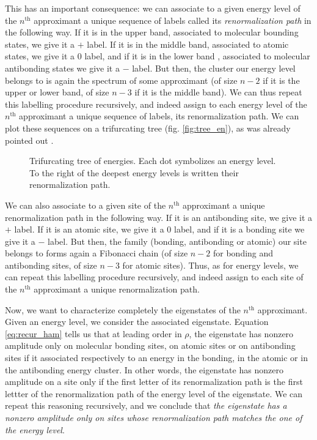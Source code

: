 \documentclass[11pt]{article}
\begin{document}
This has an important consequence: we can associate to a given energy level of the $n^\text{th}$ approximant a unique sequence of labels called its \emph{renormalization path} in the following way.
If it is in the upper band, associated to molecular bounding states, we give it a $+$  label.
If it is in the middle band, associated to atomic states, we give it a $0$ label, and if it is in the lower band , associated to molecular antibonding states we give it a $-$ label.
But then, the cluster our energy level belongs to is again the spectrum of some approximant (of size $n-2$ if it is the upper or lower band, of size $n-3$ if it is the middle band). We can thus repeat this labelling procedure recursively, and indeed assign to each energy level of the $n^\text{th}$ approximant a unique sequence of labels, its renormalization path.
We can plot these sequences on a trifurcating tree (fig. \eqref{fig:tree_en}), as was already pointed out \cite{KaluginKitaevLevitov} \cite{Piechon95}.

\begin{figure}[htp]
\centering
    	
\caption{Trifurcating tree of energies. Each dot symbolizes an energy level. To the right of the deepest energy levels is written their renormalization path.}
\label{fig:tree_en}
\end{figure}

We can also associate to a given site of the $n^\text{th}$ approximant a unique renormalization path in the following way.
If it is an antibonding site, we give it a $+$  label.
If it is an atomic site, we give it a $0$ label, and if it is a bonding site we give it a $-$ label.
But then, the family (bonding, antibonding or atomic) our site belongs to forms again a Fibonacci chain (of size $n-2$ for bonding and antibonding sites, of size $n-3$ for atomic sites). 
Thus, as for energy levels, we can repeat this labelling procedure recursively, and indeed assign to each site of the $n^\text{th}$ approximant a unique renormalization path.

Now, we want to characterize completely the eigenstates of the $n^\text{th}$ approximant. 
Given an energy level, we consider the associated eigenstate. 
Equation  \eqref{eq:recur_ham} tells us that at leading order in $\rho$, the eigenstate has nonzero amplitude only on molecular bonding sites, on atomic sites or on antibonding sites if it associated respectively to an energy in the bonding, in the atomic or in the antibonding energy cluster.
In other words, the eigenstate has nonzero amplitude on a site only if the first letter of its renormalization path is the first lettter of the renormalization path of the energy level of the eigenstate.
We can repeat this reasoning recursively, and we conclude that \emph{the eigenstate has a nonzero amplitude only on sites whose renormalization path matches the one of the energy level}.
\end{document}
